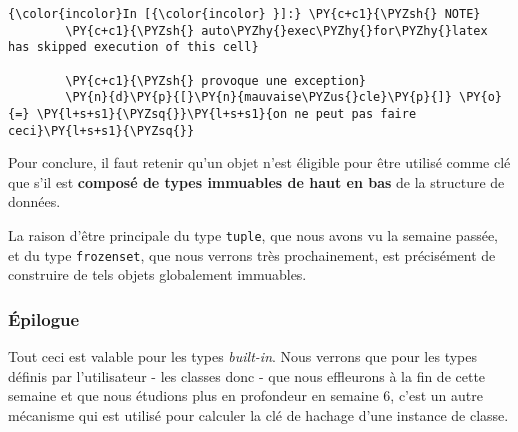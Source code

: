     \begin{Verbatim}[commandchars=\\\{\},frame=single,framerule=0.3mm,rulecolor=\color{cellframecolor}]
{\color{incolor}In [{\color{incolor} }]:} \PY{c+c1}{\PYZsh{} NOTE}
        \PY{c+c1}{\PYZsh{} auto\PYZhy{}exec\PYZhy{}for\PYZhy{}latex has skipped execution of this cell}
        
        \PY{c+c1}{\PYZsh{} provoque une exception}
        \PY{n}{d}\PY{p}{[}\PY{n}{mauvaise\PYZus{}cle}\PY{p}{]} \PY{o}{=} \PY{l+s+s1}{\PYZsq{}}\PY{l+s+s1}{on ne peut pas faire ceci}\PY{l+s+s1}{\PYZsq{}}
\end{Verbatim}


    Pour conclure, il faut retenir qu'un objet n'est éligible pour être
utilisé comme clé que s'il est \textbf{composé de types immuables de
haut en bas} de la structure de données.

    La raison d'être principale du type \texttt{tuple}, que nous avons vu la
semaine passée, et du type \texttt{frozenset}, que nous verrons très
prochainement, est précisément de construire de tels objets globalement
immuables.

    \hypertarget{uxe9pilogue}{%
\subsubsection{Épilogue}\label{uxe9pilogue}}

    Tout ceci est valable pour les types \emph{built-in}. Nous verrons que
pour les types définis par l'utilisateur - les classes donc - que nous
effleurons à la fin de cette semaine et que nous étudions plus en
profondeur en semaine 6, c'est un autre mécanisme qui est utilisé pour
calculer la clé de hachage d'une instance de classe.


    
    
    
